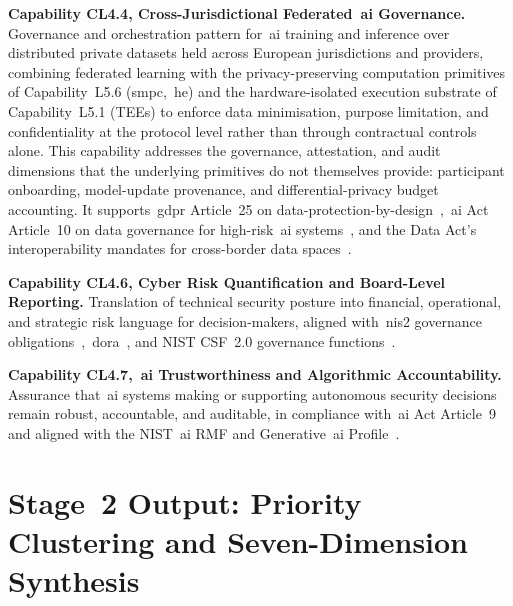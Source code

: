 \documentclass{ieeeaccess}
\begin{document}
\textbf{Capability CL4.4, Cross-Jurisdictional Federated~\gls{ai} Governance.} Governance and orchestration pattern for~\gls{ai} training and inference over distributed private datasets held across European jurisdictions and providers, combining federated learning with the privacy-preserving computation primitives of Capability~L5.6 (\acrshort{smpc},~\acrshort{he}) and the hardware-isolated execution substrate of Capability~L5.1 (TEEs) to enforce data minimisation, purpose limitation, and confidentiality at the protocol level rather than through contractual controls alone. This capability addresses the governance, attestation, and audit dimensions that the underlying primitives do not themselves provide: participant onboarding, model-update provenance, and differential-privacy budget accounting. It supports~\gls{gdpr} Article~25 on data-protection-by-design~\cite{eugdpr},~\gls{ai} Act Article~10 on data governance for high-risk~\gls{ai} systems~\cite{euaiact}, and the Data Act's interoperability mandates for cross-border data spaces~\cite{eudataact}.

\textbf{Capability CL4.6, Cyber Risk Quantification and Board-Level Reporting.} Translation of technical security posture into financial, operational, and strategic risk language for decision-makers, aligned with~\gls{nis2} governance obligations~\cite{eunis2},~\gls{dora}~\cite{eudora}, and NIST CSF~2.0 governance functions~\cite{nistcsf2}.

\textbf{Capability CL4.7,~\gls{ai} Trustworthiness and Algorithmic Accountability.} Assurance that~\gls{ai} systems making or supporting autonomous security decisions remain robust, accountable, and auditable, in compliance with~\gls{ai} Act Article~9~\cite{euaiact} and aligned with the NIST~\gls{ai} RMF and Generative~\gls{ai} Profile~\cite{nistairmf,nistaigenai}.

\section{Stage~2 Output: Priority Clustering and Seven-Dimension Synthesis}
\label{sec:stage2-clusters}
\end{document}
